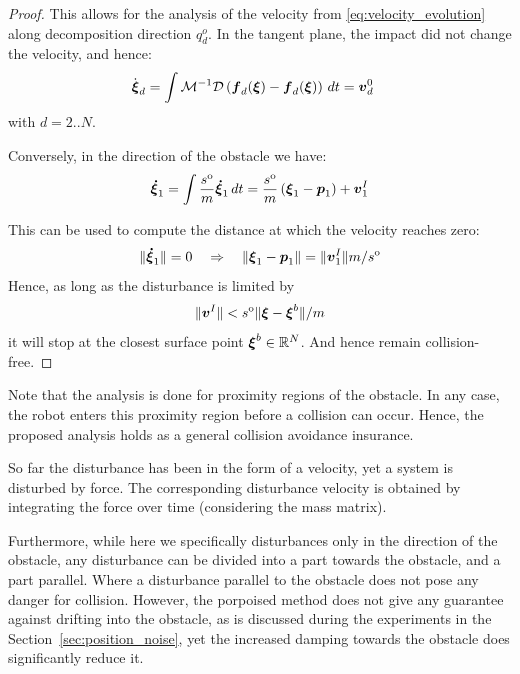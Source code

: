 \begin{proof}
This allows for the analysis of the velocity from \eqref{eq:velocity_evolution} along decomposition direction $q_d^o$. In the tangent plane, the impact did not change the velocity, and hence:
\begin{equation}
\begin{split}
    \dot{\boldsymbol{\xi}}_d & = \int \mathcal{M}^{-1} \mathcal{D}  \left( \boldsymbol{f}_d(\boldsymbol{\xi}) - \boldsymbol{f}_d(\boldsymbol{\xi}) \right) \, dt  =  \boldsymbol{v}^0_d
\end{split}
\end{equation}
with $d = 2 .. N$.

Conversely, in the direction of the obstacle we have:
\begin{equation}
    \vecs{\dot \xi}_1 = \int \frac{s^{\mathrm{o}}}{m} \vecs{ \dot \xi}_1 \, dt = \frac{s^{\mathrm{o}}}{m} \left(\vecs{\xi}_1 - \vect p_1 \right)  + \vecs v^I_1 \label{eq:velocity_with_control}
\end{equation}

This can be used to compute the distance at which the velocity reaches zero:
\begin{equation}
    \| \boldsymbol{\dot \xi} _1 \| = 0
    \quad \Rightarrow \quad
    \| \boldsymbol{\xi}_1 -  \boldsymbol{p}_1 \| = \| \boldsymbol{v}^I_1 \| {m} / {s^{\mathrm{o}}} 
\end{equation}
Hence, as long as the disturbance is limited by
\begin{equation}
    \| \boldsymbol{v}^I \| < s^{\mathrm{o}} \| \boldsymbol{\xi} - \boldsymbol{\xi}^b \| / m
\end{equation}
it will stop at the closest surface point $\boldsymbol{\xi}^b \in \mathbb{R}^N$. And hence remain collision-free.
\end{proof}

Note that the analysis is done for proximity regions of the obstacle. In any case, the robot enters this proximity region before a collision can occur. Hence, the proposed analysis holds as a general collision avoidance insurance.

So far the disturbance has been in the form of a velocity, yet a system is disturbed by force. The corresponding disturbance velocity is obtained by integrating the force over time (considering the mass matrix).

Furthermore, while here we specifically disturbances only in the direction of the obstacle, any disturbance can be divided into a part towards the obstacle, and a part parallel. Where a disturbance parallel to the obstacle does not pose any danger for collision.
However, the porpoised method does not give any guarantee against drifting into the obstacle, as is discussed during the experiments in the Section~\ref{sec:position_noise}, yet the increased damping towards the obstacle does significantly reduce it. 

